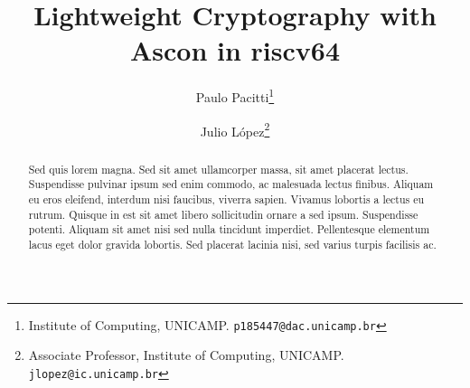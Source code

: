\documentclass[11pt,twoside]{article}
\begin{document}
% 
\TRMakeCover


%
\pagestyle{myheadings}
\thispagestyle{empty}

%
\title{Lightweight Cryptography with Ascon in riscv64}

\author{Paulo Pacitti\thanks{Institute of Computing, UNICAMP. \texttt{p185447@dac.unicamp.br}} \and
  Julio  López\thanks{Associate Professor, Institute of Computing, UNICAMP. \texttt{jlopez@ic.unicamp.br}}}
\date{}
\maketitle


\begin{abstract}
  Sed quis lorem magna. Sed sit amet ullamcorper massa, sit amet placerat lectus. Suspendisse pulvinar ipsum sed enim commodo, ac malesuada lectus finibus. Aliquam eu eros eleifend, interdum nisi faucibus, viverra sapien. Vivamus lobortis a lectus eu rutrum.
  Quisque in est sit amet libero sollicitudin ornare a sed ipsum. Suspendisse potenti.
  Aliquam sit amet nisi sed nulla tincidunt imperdiet. Pellentesque elementum lacus eget
  dolor gravida lobortis. Sed placerat lacinia nisi, sed varius turpis facilisis ac.
\end{abstract}
\end{document}
